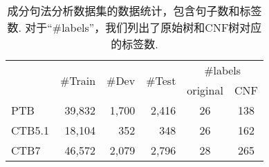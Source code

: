 \begin{table}[tb!]
    \centering
    \caption{成分句法分析数据集的数据统计，包含句子数和标签数.
        对于``\#labels''，我们列出了原始树和CNF树对应的标签数.}
    \begin{tabular}{lrrr|cc}
        \toprule
               & \multirow{2}{*}{\#Train} & \multirow{2}{*}{\#Dev} & \multirow{2}{*}{\#Test} & \multicolumn{2}{c}{\#labels}       \\
               &                          &                        &                         & original                     & CNF \\[1pt]
        \midrule
        PTB    & 39,832                   & 1,700                  & 2,416                   & 26                           & 138 \\
        CTB5.1 & 18,104                   & 352                    & 348                     & 26                           & 162 \\
        CTB7   & 46,572                   & 2,079                  & 2,796                   & 28                           & 265 \\
        \bottomrule
    \end{tabular}
    \label{table:con-statistics}
\end{table}